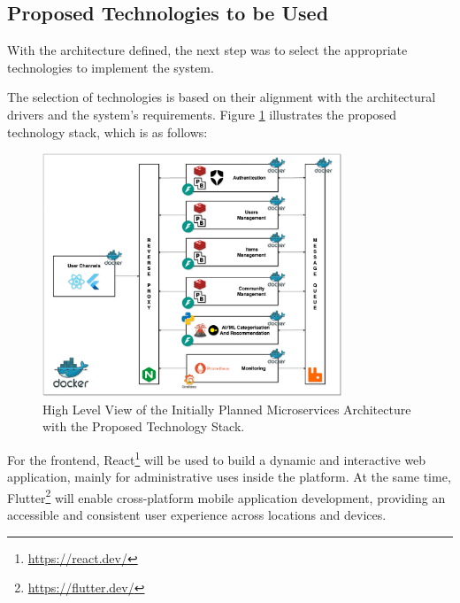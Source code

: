 
\subsection{Proposed Technologies to be Used}

With the architecture defined, the next step was to select the appropriate technologies to implement the system.

The selection of technologies is based on their alignment with the architectural drivers and the system's requirements. Figure \ref{fig:initial_arch} illustrates the proposed technology stack, which is as follows:

\begin{figure}[!htb]
    \includegraphics[width=0.8\textwidth]{figs/chapter3/initial_arch.png}
    \centering
    \caption[Initial Technical Architecture]{High Level View of the Initially Planned Microservices Architecture with the Proposed Technology Stack.}
    \label{fig:initial_arch}
\end{figure}

For the frontend, React\footnote{\url{https://react.dev/}} will be used to build a dynamic and interactive web application, mainly for administrative uses inside the platform. At the same time, Flutter\footnote{\url{https://flutter.dev/}} will enable cross-platform mobile application development, providing an accessible and consistent user experience across locations and devices.

